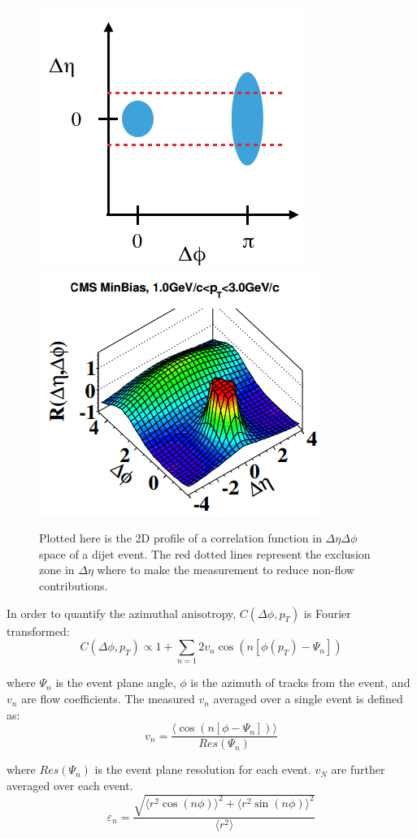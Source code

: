 \begin{figure}[!ht]
\begin{center}
\includegraphics[width=0.45\linewidth]{figs/jet_corr_example.png}
\includegraphics[width=0.47\linewidth]{figs/pp_correlation_function_min_bias.png}
\caption{Plotted here is the 2D profile of a correlation function in $\Delta\eta \Delta\phi$ space of a dijet event. The red dotted lines represent the exclusion zone in $\Delta\eta$ where to  make the measurement to reduce non-flow contributions.}
\label{fig:jet_corr_example}
\end{center}
\end{figure}

In order to quantify the azimuthal anisotropy, $C(\Delta\phi,p_T)$ is Fourier transformed:
\begin{equation}\label{eqn:dndphi}
  C(\Delta\phi,p_T) \propto 1 + \sum_{n=1}2 v_{n}\cos(n[\phi(p_T)-\Psi_n]) 
\end{equation}

where $\Psi_n$ is the event plane angle, $\phi$ is the azimuth of tracks from the event, and $v_n$ are flow coefficients. The measured $v_n$ averaged over a single event is defined as:
\begin{equation}\label{eqn:vn}
  v_n = \frac{\langle\cos(n[\phi-\Psi_n])\rangle}{Res(\Psi_n)}
\end{equation}

where $Res(\Psi_n)$ is the event plane resolution for each event. $v_N$ are further averaged over each event.
\begin{equation}
\varepsilon_n = \frac{\sqrt{\langle r^2\cos (n\phi)\rangle ^2 + \langle r^2\sin (n\phi) \rangle ^2}}{\langle r^2 \rangle}
\end{equation}

